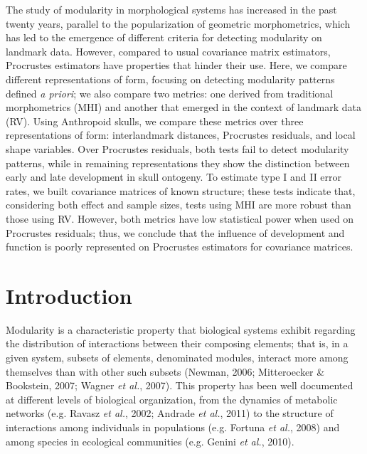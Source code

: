 \documentclass[12pt,twoside]{report}
\begin{document}
The study of modularity in morphological systems has increased in the
past twenty years, parallel to the popularization of geometric
morphometrics, which has led to the emergence of different criteria for
detecting modularity on landmark data. However, compared to usual
covariance matrix estimators, Procrustes estimators have properties that
hinder their use. Here, we compare different representations of form,
focusing on detecting modularity patterns defined \emph{a priori}; we
also compare two metrics: one derived from traditional morphometrics
(MHI) and another that emerged in the context of landmark data (RV).
Using Anthropoid skulls, we compare these metrics over three
representations of form: interlandmark distances, Procrustes residuals,
and local shape variables. Over Procrustes residuals, both tests fail to
detect modularity patterns, while in remaining representations they show
the distinction between early and late development in skull ontogeny. To
estimate type I and II error rates, we built covariance matrices of
known structure; these tests indicate that, considering both effect and
sample sizes, tests using MHI are more robust than those using RV.
However, both metrics have low statistical power when used on Procrustes
residuals; thus, we conclude that the influence of development and
function is poorly represented on Procrustes estimators for covariance
matrices.

\newpage

\section{Introduction}\label{introduction}

Modularity is a characteristic property that biological systems exhibit
regarding the distribution of interactions between their composing
elements; that is, in a given system, subsets of elements, denominated
modules, interact more among themselves than with other such subsets
(Newman, 2006; Mitteroecker \& Bookstein, 2007; Wagner \emph{et al.},
2007). This property has been well documented at different levels of
biological organization, from the dynamics of metabolic networks (e.g.
Ravasz \emph{et al.}, 2002; Andrade \emph{et al.}, 2011) to the
structure of interactions among individuals in populations (e.g. Fortuna
\emph{et al.}, 2008) and among species in ecological communities (e.g.
Genini \emph{et al.}, 2010).
\end{document}
